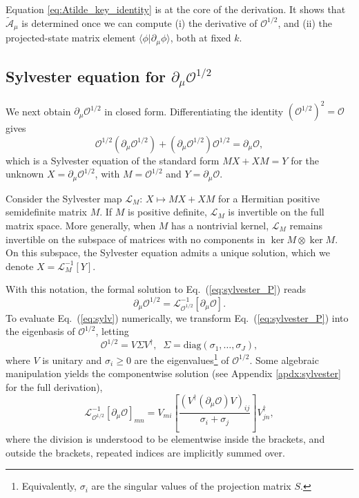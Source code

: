 \documentclass[galley,aps,pra,10pt,amsmath,amssymb,
    superscriptaddress,nofootinbib,longbibliography]{revtex4-2}
\newcounter{comm}
\newcommand{\eq}[1]{Eq.~(\ref{eq:#1})}
\begin{document}
Equation \eqref{eq:Atilde_key_identity} is at the core of the derivation. It shows that $\tilde{\mathcal{A}}_\mu$ is determined once we can compute (i) the derivative of $\mathcal{O}^{1/2}$, and (ii) the projected-state matrix element $\langle\phi|\partial_\mu\phi\rangle$, both at fixed $k$.

\subsection{Sylvester equation for $\partial_\mu \mathcal{O}^{1/2}$}

We next obtain $\partial_\mu \mathcal{O}^{1/2}$ in closed form. Differentiating the identity $(\mathcal{O}^{1/2})^2=\mathcal{O}$ gives
\begin{equation}
\label{eq:sylvester_P}
\mathcal{O}^{1/2}(\partial_\mu \mathcal{O}^{1/2})+(\partial_\mu \mathcal{O}^{1/2})\mathcal{O}^{1/2}=\partial_\mu \mathcal{O},
\end{equation}
which is a Sylvester equation of the standard form $MX + XM = Y$ for the unknown $X=\partial_\mu \mathcal{O}^{1/2}$, with $M=\mathcal{O}^{1/2}$ and $Y=\partial_\mu \mathcal{O}$. 

Consider the Sylvester map $\mathcal{L}_M:\,X\mapsto MX+XM$ for a Hermitian positive semidefinite matrix $M$. If $M$ is positive definite, $\mathcal{L}_M$ is invertible on the full matrix space. More generally, when $M$ has a nontrivial kernel, $\mathcal{L}_M$ remains invertible on the subspace of matrices with no components in $\ker{M} \otimes \ker{M}$. On this subspace, the Sylvester equation admits a unique solution, which we denote $X=\mathcal{L}_M^{-1}[Y]$. 

With this notation, the formal solution to \eq{sylvester_P} reads
\begin{equation}
\label{eq:sylv}
\partial_\mu \mathcal{O}^{1/2}
=
\mathcal{L}_{\mathcal{O}^{1/2}}^{-1}\!\left[\partial_\mu \mathcal{O}\right].
\end{equation}
To evaluate \eq{sylv} numerically, we transform \eq{sylvester_P} into the eigenbasis of $\mathcal{O}^{1/2}$, letting
\begin{equation}
\label{eq:M_diag}
\mathcal{O}^{1/2} = V\Sigma V^\dagger,
\;\;
\Sigma=\mathrm{diag}(\sigma_1,\dots,\sigma_J),
\end{equation}
where $V$ is unitary and $\sigma_i \ge 0$ are the eigenvalues\footnote{Equivalently, $\sigma_i$ are the singular values of the projection matrix $S$.} of $\mathcal{O}^{1/2}$. Some algebraic manipulation yields the componentwise solution (see Appendix \ref{apdx:sylvester} for the full derivation),
\begin{equation}
\label{eq:syl_sol}
\mathcal{L}_{\mathcal{O}^{1/2}}^{-1}[\partial_\mu \mathcal{O}]_{mn}
=
V_{mi}\left[
\frac{(V^\dagger (\partial_\mu \mathcal{O}) V)_{ij}}{\sigma_i+\sigma_j}
\right]V^\dagger_{jn} ,
\end{equation}
where the division is understood to be elementwise inside the brackets, and outside the brackets, repeated indices are implicitly summed over.
\end{document}
